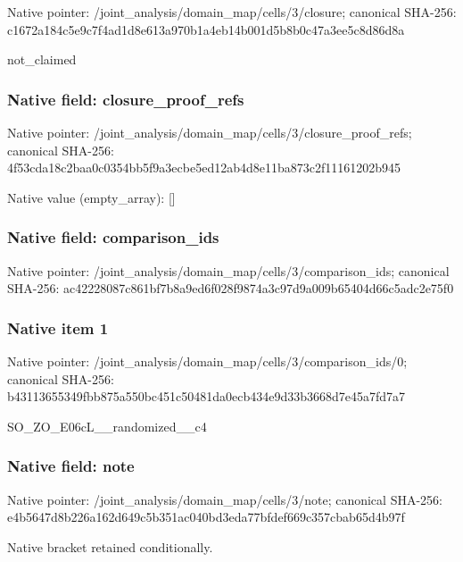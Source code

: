 \documentclass[10pt,a4paper]{article}
\begin{document}
Native pointer: /joint\_analysis/domain\_m\allowbreak{}ap/cells/3/closure; canonical SHA-256: c1672a184c5e9c7f4ad1d8e6\allowbreak{}13a970b1a4eb14b001d5b8b0\allowbreak{}c47a3ee5c8d86d8a


not\_claimed


\subsubsection{Native field: closure\_proof\_refs}


Native pointer: /joint\_analysis/domain\_m\allowbreak{}ap/cells/3/closure\_proof\allowbreak{}\_refs; canonical SHA-256: 4f53cda18c2baa0c0354bb5f\allowbreak{}9a3ecbe5ed12ab4d8e11ba87\allowbreak{}3c2f11161202b945



Native value (empty\_array): []



\subsubsection{Native field: comparison\_ids}


Native pointer: /joint\_analysis/domain\_m\allowbreak{}ap/cells/3/comparison\_id\allowbreak{}s; canonical SHA-256: ac42228087c861bf7b8a9ed6\allowbreak{}f028f9874a3c97d9a009b654\allowbreak{}04d66c5adc2e75f0



\subsubsection{Native item 1}


Native pointer: /joint\_analysis/domain\_m\allowbreak{}ap/cells/3/comparison\_id\allowbreak{}s/0; canonical SHA-256: b43113655349fbb875a550bc\allowbreak{}451c50481da0ecb434e9d33b\allowbreak{}3668d7e45a7fd7a7


SO\_ZO\_E06cL\_\_randomized\_\_c4


\subsubsection{Native field: note}


Native pointer: /joint\_analysis/domain\_map/cells/3/note; canonical SHA-256: e4b5647d8b226a162d649c5b\allowbreak{}351ac040bd3eda77bfdef669\allowbreak{}c357cbab65d4b97f


Native bracket retained conditionally.
\end{document}
